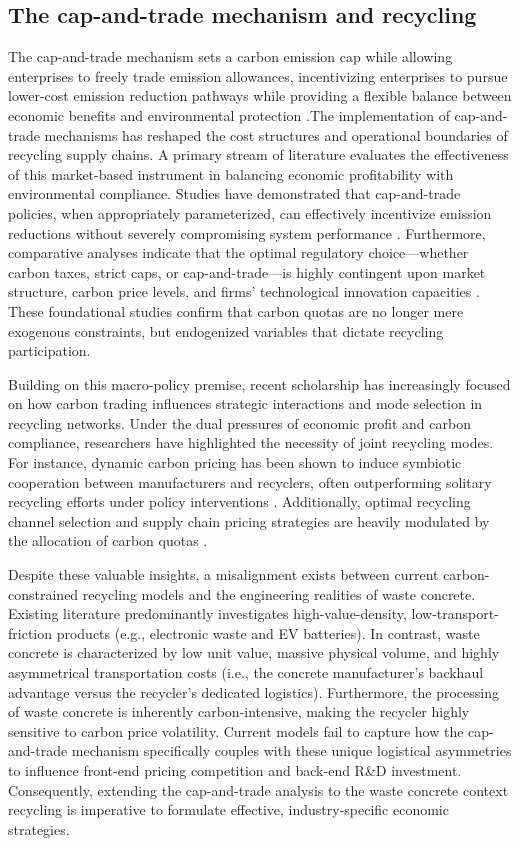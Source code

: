 \documentclass[authoryear,preprint,review,times,10pt]{elsarticle}
\begin{document}
\subsection{The cap-and-trade mechanism and recycling}
The cap-and-trade mechanism sets a carbon emission cap while allowing enterprises to freely trade emission allowances, incentivizing enterprises to pursue lower-cost emission reduction pathways while providing a flexible balance between economic benefits and environmental protection \citep{li2019How}.The implementation of cap-and-trade mechanisms has reshaped the cost structures and operational boundaries of recycling supply chains. A primary stream of literature evaluates the effectiveness of this market-based instrument in balancing economic profitability with environmental compliance. Studies have demonstrated that cap-and-trade policies, when appropriately parameterized, can effectively incentivize emission reductions without severely compromising system performance \citep{bai2022Distributionally}. Furthermore, comparative analyses indicate that the optimal regulatory choice—whether carbon taxes, strict caps, or cap-and-trade—is highly contingent upon market structure, carbon price levels, and firms' technological innovation capacities \citep{lyu2022Manufacturers,huang2024Optimal}. These foundational studies confirm that carbon quotas are no longer mere exogenous constraints, but endogenized variables that dictate recycling participation.

Building on this macro-policy premise, recent scholarship has increasingly focused on how carbon trading influences strategic interactions and mode selection in recycling networks. Under the dual pressures of economic profit and carbon compliance, researchers have highlighted the necessity of joint recycling modes. For instance, dynamic carbon pricing has been shown to induce symbiotic cooperation between manufacturers and recyclers, often outperforming solitary recycling efforts under policy interventions \citep{cao2023Developing,wu2024Electric}. Additionally, optimal recycling channel selection and supply chain pricing strategies are heavily modulated by the allocation of carbon quotas \citep{zhang2022Recycling}.

Despite these valuable insights, a misalignment exists between current carbon-constrained recycling models and the engineering realities of waste concrete. Existing literature predominantly investigates high-value-density, low-transport-friction products (e.g., electronic waste and EV batteries). In contrast, waste concrete is characterized by low unit value, massive physical volume, and highly asymmetrical transportation costs (i.e., the concrete manufacturer's backhaul advantage versus the recycler's dedicated logistics). Furthermore, the processing of waste concrete is inherently carbon-intensive, making the recycler highly sensitive to carbon price volatility. Current models fail to capture how the cap-and-trade mechanism specifically couples with these unique logistical asymmetries to influence front-end pricing competition and back-end R\&D investment. Consequently, extending the cap-and-trade analysis to the waste concrete context recycling is imperative to formulate effective, industry-specific economic strategies.
\end{document}
